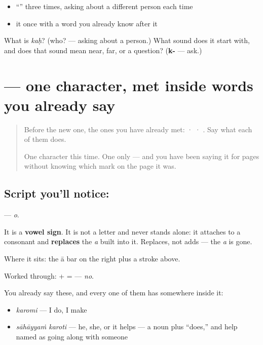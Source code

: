 \begin{itemize}
\raggedright
  \item \textquotedblleft{}\textquotedblright{} three times, asking about a different person each time
  \item it once with a word you already know after it
\end{itemize}

\begin{tcolorbox}[breakable,colback=teal!4,colframe=teal!35!black,title={Before you move on}]
What is \emph{kaḥ}? (who? — asking about a person.) What sound does it start with, and does that sound mean near, far, or a question? (\textbf{k-} — ask.)
\end{tcolorbox}
\section[\texorpdfstring{\sk{ो} (o)}{ो (o)}]{ — one character, met inside words you already say}

\label{lesson:SA-S214-vowel-sign-o}



\begin{quote}
Before the new one, the ones you have already met:  ·  · . Say what each of them does.

One character this time. One only — and you have been saying it for pages without knowing which mark on the page it was.
\end{quote}

\subsection*{Script you'll notice: }
\textbf{} — \emph{o}.

It is a \textbf{vowel sign}. It is not a letter and never stands alone: it attaches to a consonant and \textbf{replaces} the \emph{a} built into it. Replaces, not adds — the \emph{a} is gone.

Where it sits: the ā bar on the right plus a stroke above.

Worked through: \textbf{} + \textbf{} = \textbf{} — \emph{no}.

You already say these, and every one of them has  somewhere inside it:

\begin{itemize}
\raggedright
  \item \textbf{} \emph{karomi} — I do, I make
  \item \textbf{ } \emph{sāhāyyaṁ karoti} — he, she, or it helps — a noun plus \textquotedblleft{}does,\textquotedblright{} and help named as going along with someone
\end{itemize}

